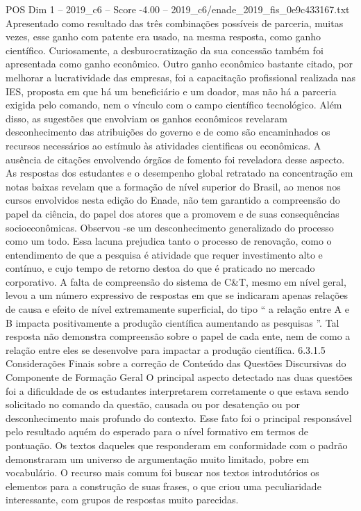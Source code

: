 \begin{textsample}{POS Dim 1 – 2019\_c6 – Score -4.00 – 2019\_c6/enade\_2019\_fis\_0e9c433167.txt}
Apresentado como resultado das três combinações possíveis de parceria, muitas vezes, esse ganho com patente era usado, na mesma resposta, como ganho científico.
Curiosamente, a desburocratização da sua concessão também foi apresentada como ganho econômico.
Outro ganho econômico bastante citado, por melhorar a lucratividade das empresas, foi a capacitação profissional realizada nas IES, proposta em que há um beneficiário e um doador, mas não há a parceria exigida pelo comando, nem o vínculo com o campo científico tecnológico.
Além disso, as sugestões que envolviam os ganhos econômicos revelaram desconhecimento das atribuições do governo e de como são encaminhados os recursos necessários ao estímulo às atividades cientificas ou econômicas.
A ausência de citações envolvendo órgãos de fomento foi reveladora desse aspecto.
As respostas dos estudantes e o desempenho global retratado na concentração em notas baixas revelam que a formação de nível superior do Brasil, ao menos nos cursos envolvidos nesta edição do Enade, não tem garantido a compreensão do papel da ciência, do papel dos atores que a promovem e de suas consequências socioeconômicas.
Observou -se um desconhecimento generalizado do processo como um todo.
Essa lacuna prejudica tanto o processo de renovação, como o entendimento de que a pesquisa é atividade que requer investimento alto e contínuo, e cujo tempo de retorno destoa do que é praticado no mercado corporativo.
A falta de compreensão do sistema de C\&T, mesmo em nível geral, levou a um número expressivo de respostas em que se indicaram apenas relações de causa e efeito de nível extremamente superficial, do tipo “ a relação entre A e B impacta positivamente a produção científica aumentando as pesquisas ”.
Tal resposta não demonstra compreensão sobre o papel de cada ente, nem de como a relação entre eles se desenvolve para impactar a produção científica. 6.3.1.5 Considerações Finais sobre a correção de Conteúdo das Questões Discursivas do Componente de Formação Geral O principal aspecto detectado nas duas questões foi a dificuldade de os estudantes interpretarem corretamente o que estava sendo solicitado no comando da questão, causada ou por desatenção ou por desconhecimento mais profundo do contexto.
Esse fato foi o principal responsável pelo resultado aquém do esperado para o nível formativo em termos de pontuação.
Os textos daqueles que responderam em conformidade com o padrão demonstraram um universo de argumentação muito limitado, pobre em vocabulário.
O recurso mais comum foi buscar nos textos introdutórios os elementos para a construção de suas frases, o que criou uma peculiaridade interessante, com grupos de respostas muito parecidas.

\end{textsample}
